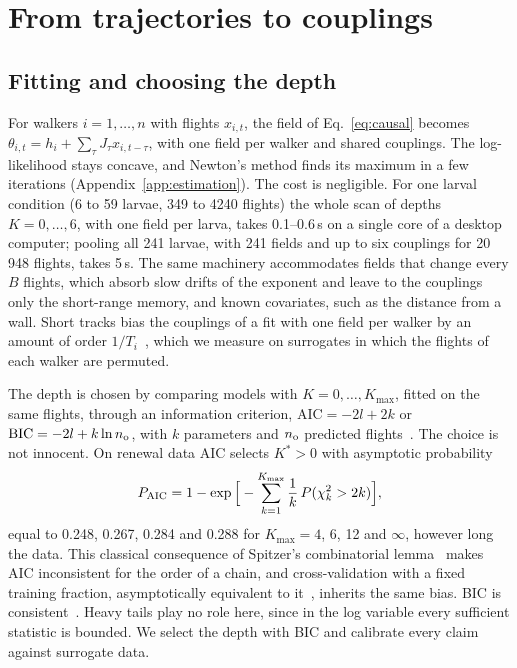 \section{From trajectories to couplings}\label{sec:inference}

\subsection{Fitting and choosing the depth}\label{sec:estimation}

For walkers $i=1,\dots,n$ with flights $x_{i,t}$, the field of Eq.~\eqref{eq:causal} becomes $\theta_{i,t}=h_i+\sum_\tau J_\tau x_{i,t-\tau}$, with one field per walker and shared couplings. The log-likelihood stays concave, and Newton's method finds its maximum in a few iterations (Appendix~\ref{app:estimation}). The cost is negligible. For one larval condition (6 to 59 larvae, 349 to 4240 flights) the whole scan of depths $K=0,\dots,6$, with one field per larva, takes 0.1--0.6\,s on a single core of a desktop computer; pooling all 241 larvae, with 241 fields and up to six couplings for 20\,948 flights, takes 5\,s. The same machinery accommodates fields that change every $B$ flights, which absorb slow drifts of the exponent and leave to the couplings only the short-range memory, and known covariates, such as the distance from a wall. Short tracks bias the couplings of a fit with one field per walker by an amount of order $1/T_i$~\cite{Nickell1981}, which we measure on surrogates in which the flights of each walker are permuted.

The depth is chosen by comparing models with $K=0,\dots,K_{\max}$, fitted on the same flights, through an information criterion, $\mathrm{AIC}=-2l+2k$ or $\mathrm{BIC}=-2l+k\ln n_{\rm o}$, with $k$ parameters and $n_{\rm o}$ predicted flights~\cite{Akaike1974,Schwarz1978}. The choice is not innocent. On renewal data AIC selects $K^*>0$ with asymptotic probability
\begin{equation}
P_{\rm AIC}=1-\exp\Big[-\sum_{k=1}^{K_{\max}}\frac1k\,P(\chi^2_k>2k)\Big],
\label{eq:woodroofe}
\end{equation}
equal to 0.248, 0.267, 0.284 and 0.288 for $K_{\max}=4$, 6, 12 and $\infty$, however long the data. This classical consequence of Spitzer's combinatorial lemma~\cite{Shibata1976,Woodroofe1982} makes AIC inconsistent for the order of a chain, and cross-validation with a fixed training fraction, asymptotically equivalent to it~\cite{Stone1977,Shao1993}, inherits the same bias. BIC is consistent~\cite{Katz1981,CsiszarShields2000}. Heavy tails play no role here, since in the log variable every sufficient statistic is bounded. We select the depth with BIC and calibrate every claim against surrogate data.

